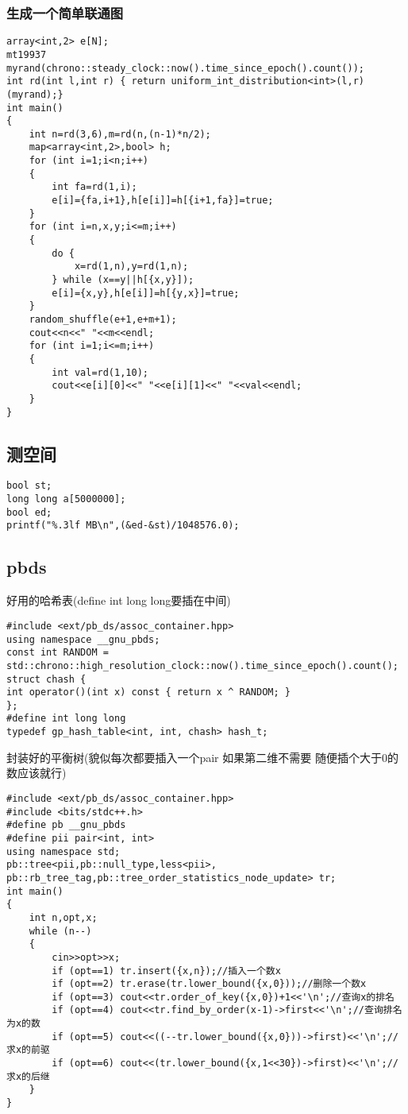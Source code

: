 \documentclass[a4paper]{ctexart}
\begin{document}
\subsubsection{生成一个简单联通图}

\begin{lstlisting}
array<int,2> e[N];
mt19937 myrand(chrono::steady_clock::now().time_since_epoch().count());
int rd(int l,int r) { return uniform_int_distribution<int>(l,r)(myrand);}
int main()
{
    int n=rd(3,6),m=rd(n,(n-1)*n/2);
    map<array<int,2>,bool> h;
    for (int i=1;i<n;i++)
    {
        int fa=rd(1,i);
        e[i]={fa,i+1},h[e[i]]=h[{i+1,fa}]=true;
    }
    for (int i=n,x,y;i<=m;i++)
    {
        do {
            x=rd(1,n),y=rd(1,n);
        } while (x==y||h[{x,y}]);
        e[i]={x,y},h[e[i]]=h[{y,x}]=true;
    }
    random_shuffle(e+1,e+m+1);
    cout<<n<<" "<<m<<endl;
    for (int i=1;i<=m;i++)
    {
        int val=rd(1,10);
        cout<<e[i][0]<<" "<<e[i][1]<<" "<<val<<endl;
    }
}
\end{lstlisting}

\subsection{测空间}

\begin{lstlisting}
bool st;
long long a[5000000];
bool ed;
printf("%.3lf MB\n",(&ed-&st)/1048576.0);
\end{lstlisting}

\subsection{pbds}
好用的哈希表(define int long long要插在中间)
\begin{lstlisting}
#include <ext/pb_ds/assoc_container.hpp>
using namespace __gnu_pbds;
const int RANDOM = std::chrono::high_resolution_clock::now().time_since_epoch().count();
struct chash {
int operator()(int x) const { return x ^ RANDOM; }
};
#define int long long
typedef gp_hash_table<int, int, chash> hash_t;
\end{lstlisting}

封装好的平衡树(貌似每次都要插入一个pair 如果第二维不需要 随便插个大于0的数应该就行)

\begin{lstlisting}
#include <ext/pb_ds/assoc_container.hpp>
#include <bits/stdc++.h>
#define pb __gnu_pbds
#define pii pair<int, int>
using namespace std;
pb::tree<pii,pb::null_type,less<pii>,
pb::rb_tree_tag,pb::tree_order_statistics_node_update> tr;
int main() 
{
    int n,opt,x;
    while (n--)
    {
        cin>>opt>>x;
        if (opt==1) tr.insert({x,n});//插入一个数x
        if (opt==2) tr.erase(tr.lower_bound({x,0}));//删除一个数x
        if (opt==3) cout<<tr.order_of_key({x,0})+1<<'\n';//查询x的排名
        if (opt==4) cout<<tr.find_by_order(x-1)->first<<'\n';//查询排名为x的数
        if (opt==5) cout<<((--tr.lower_bound({x,0}))->first)<<'\n';//求x的前驱
        if (opt==6) cout<<(tr.lower_bound({x,1<<30})->first)<<'\n';//求x的后继
    }
}
\end{lstlisting}
\end{document}
